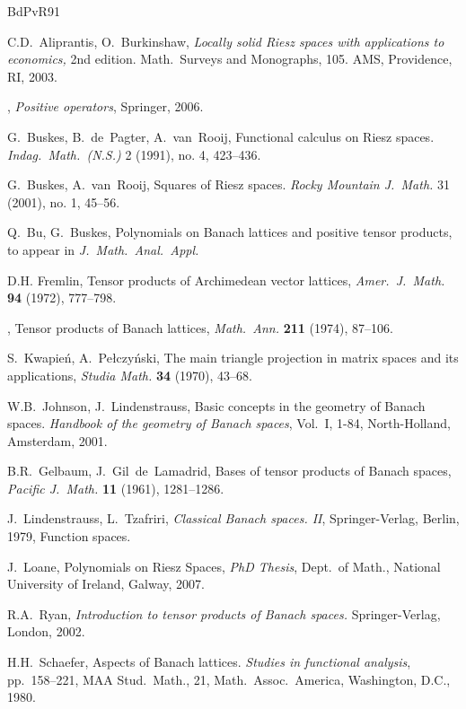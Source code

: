 \documentclass[12pt]{amsart}
\theoremstyle{plain}
\theoremstyle{definition}
\begin{document}
\begin{thebibliography}{BdPvR91}

C.D.~Aliprantis, O.~Burkinshaw,
\emph{Locally solid Riesz spaces with applications to economics,}
2nd edition. Math.\ Surveys and Monographs, 105. AMS, Providence, RI, 2003.

\bysame, \emph{Positive operators},
  Springer, 2006.


G.~Buskes, B.~de~Pagter, A.~van~Rooij,  Functional calculus on
Riesz spaces. \emph{Indag.\ Math.\ (N.S.)} 2 (1991), no. 4, 423--436.

G.~Buskes, A.~van~Rooij, Squares of {R}iesz spaces. \emph{Rocky Mountain
J.\ Math.} 31 (2001), no. 1, 45--56.

Q.~Bu, G.~Buskes,
Polynomials on Banach lattices and positive tensor products,
to appear in \emph{J.\ Math.\ Anal.\ Appl.}

D.H. Fremlin, Tensor products of {A}rchimedean vector lattices, \emph{Amer.\
J.\ Math.} \textbf{94} (1972), 777--798.

\bysame, Tensor products of {B}anach lattices, \emph{Math.\ Ann.} \textbf{211}
  (1974), 87--106.

S.~Kwapie\'n, A.~Pe{\l}\-czy{\'n}\-ski,
The main triangle projection in matrix spaces and its applications,
\emph{Studia Math.} \textbf{34} (1970), 43--68.


 W.B.~Johnson, J.~Lindenstrauss, 
  Basic concepts in the geometry of Banach spaces. \emph{Handbook of the
  geometry of Banach spaces}, Vol.\ I, 1-84, North-Holland, Amsterdam,
  2001.

B.R.~Gelbaum,  J.~Gil~de~Lamadrid, Bases of tensor products of
  {B}anach spaces, \emph{Pacific J.\ Math.} \textbf{11} (1961), 1281--1286.

J.~Lindenstrauss, L.~Tzafriri, \emph{Classical {B}anach spaces.
  {I}{I}}, Springer-Verlag, Berlin, 1979, Function spaces.

J.~Loane, Polynomials on Riesz Spaces, \emph{PhD Thesis}, Dept.\ of Math.,
National University of Ireland, Galway, 2007.

R.A.~Ryan,
\emph{Introduction to tensor products of Banach spaces.}
Springer-Verlag, London, 2002.

 H.H.~Schaefer,
Aspects of Banach lattices.
\emph{Studies in functional analysis},
pp.~158--221, MAA Stud.\ Math., 21, Math.\ Assoc.\ America, Washington, D.C., 1980.

\end{thebibliography}
\end{document}
